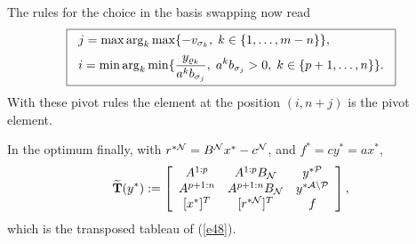 The rules for the choice in the basis swapping now read
\begin{equation} \label{e51}
\fbox{$
\ba{.}{l}
j = \max \arg_k \max \{- v_{\sigma _k}, \; k \in \{1, \ldots, m- n\}
\},\\[2mm]
\dis i = \min \arg_k \min \{ \frac{y_{\rho _k}}{a^kb_{\sigma _j}}, \;
a^kb_{\sigma _j} > 0, \; k \in \{p+1, \ldots, n\}\}.
\ea{.}
$}
\end{equation}
With these pivot rules the element at the position $(i,n+j)$ is
the pivot element.
\par
In the optimum finally, with $r^{*\N} = B^{\N}x^* - c^{\N}$, and
$f^* = cy^* = ax^*$,
\[
\wi{{\bf T}}(y^*) :=
\ba{[}{ccc}
A^{1:p}    & A^{1:p}B_{\N} & y^{*\P} \\
A^{p+1:n}  & A^{p+1:n}B_{\N} & y^{*\A \backslash \P}\\[0mm]
[x^*]^T  & [r^{*\N}]^T  & f
\ea{]},
\]
which is the transposed tableau of (\ref{e48}).
